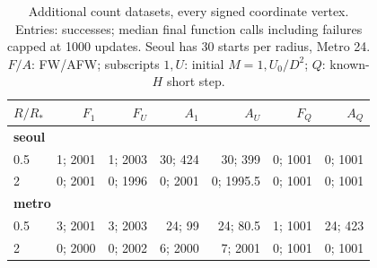 \begin{table}[htbp]
\centering\small
\caption{Additional count datasets, every signed coordinate vertex. Entries: successes; median final function calls including failures capped at 1000 updates. Seoul has 30 starts per radius, Metro 24. $F/A$: FW/AFW; subscripts $1,U$: initial $M=1,U_0/D^2$; $Q$: known-$H$ short step.}
\label{tab:multidata}
\begin{tabular}{lrrrrrr}
\hline
$R/R_*$ & $F_1$ & $F_U$ & $A_1$ & $A_U$ & $F_Q$ & $A_Q$ \\
\hline
\multicolumn{7}{l}{\textbf{seoul}} \\
0.5 & 1; 2001 & 1; 2003 & 30; 424 & 30; 399 & 0; 1001 & 0; 1001 \\
2 & 0; 2001 & 0; 1996 & 0; 2001 & 0; 1995.5 & 0; 1001 & 0; 1001 \\
\hline
\multicolumn{7}{l}{\textbf{metro}} \\
0.5 & 3; 2001 & 3; 2003 & 24; 99 & 24; 80.5 & 1; 1001 & 24; 423 \\
2 & 0; 2000 & 0; 2002 & 6; 2000 & 7; 2001 & 0; 1001 & 0; 1001 \\
\hline
\end{tabular}
\end{table}

